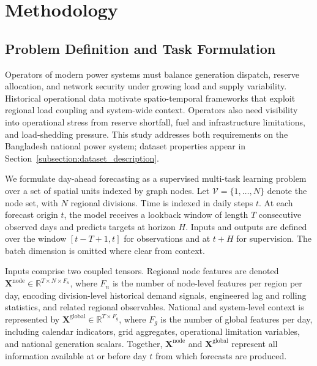 \section{Methodology}\label{sec:methodology}

\subsection{Problem Definition and Task Formulation}\label{subsection:problem_definition_and_task_formulation}

Operators of modern power systems must balance generation dispatch, reserve allocation, and network security under growing load and supply variability. Historical operational data motivate spatio-temporal frameworks that exploit regional load coupling and system-wide context. Operators also need visibility into operational stress from reserve shortfall, fuel and infrastructure limitations, and load-shedding pressure. This study addresses both requirements on the Bangladesh national power system; dataset properties appear in Section~\ref{subsection:dataset_description}.

We formulate day-ahead forecasting as a supervised multi-task learning problem \cite{Caruana1997Multitask} over a set of spatial units indexed by graph nodes. Let \(\mathcal{V} = \{1, \ldots, N\}\) denote the node set, with \(N\) regional divisions. Time is indexed in daily steps \(t\). At each forecast origin \(t\), the model receives a lookback window of length \(T\) consecutive observed days and predicts targets at horizon \(H\). Inputs and outputs are defined over the window \([t - T + 1, t]\) for observations and at \(t + H\) for supervision. The batch dimension is omitted where clear from context.

Inputs comprise two coupled tensors. Regional node features are denoted \(\mathbf{X}^{\mathrm{node}} \in \mathbb{R}^{T \times N \times F_n}\), where \(F_n\) is the number of node-level features per region per day, encoding division-level historical demand signals, engineered lag and rolling statistics, and related regional observables. National and system-level context is represented by \(\mathbf{X}^{\mathrm{global}} \in \mathbb{R}^{T \times F_g}\), where \(F_g\) is the number of global features per day, including calendar indicators, grid aggregates, operational limitation variables, and national generation scalars. Together, \(\mathbf{X}^{\mathrm{node}}\) and \(\mathbf{X}^{\mathrm{global}}\) represent all information available at or before day \(t\) from which forecasts are produced.

